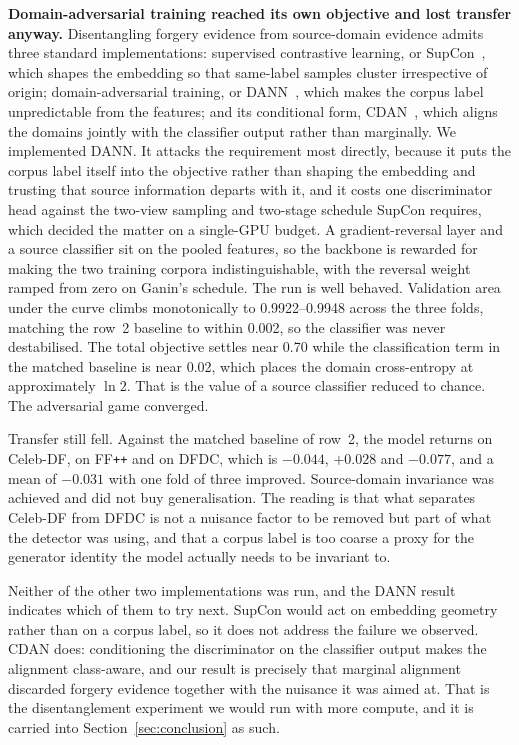 \documentclass[journal,onecolumn]{IEEEtran}
\newcommand{\celebdf}{Celeb-DF}
\newcommand{\ffpp}{FF\texttt{++}}
\newcommand{\dfdc}{DFDC}
\begin{document}
\textbf{Domain-adversarial training reached its own objective and lost
transfer anyway.} Disentangling forgery evidence from source-domain evidence
admits three standard implementations: supervised contrastive learning, or
SupCon~\cite{khosla2020supcon}, which shapes the embedding so that same-label
samples cluster irrespective of origin; domain-adversarial training, or
DANN~\cite{ganin2016dann}, which makes the corpus label unpredictable from the
features; and its conditional form, CDAN~\cite{long2018cdan}, which aligns the
domains jointly with the classifier output rather than marginally. We
implemented DANN. It attacks the requirement most directly, because it puts the
corpus label itself into the objective rather than shaping the embedding and
trusting that source information departs with it, and it costs one discriminator
head against the two-view sampling and two-stage schedule SupCon requires, which
decided the matter on a single-GPU budget. A gradient-reversal layer and a
source classifier sit on the pooled features, so the backbone is rewarded for
making the two training corpora indistinguishable, with the reversal weight
ramped from zero on Ganin's schedule. The run is well behaved. Validation area under the curve climbs
monotonically to 0.9922--0.9948 across the three folds, matching the row~2
baseline to within 0.002, so the classifier was never destabilised. The total
objective settles near 0.70 while the classification term in the matched
baseline is near 0.02, which places the domain cross-entropy at approximately
$\ln 2$. That is the value of a source classifier reduced to chance. The
adversarial game converged.

Transfer still fell. Against the matched baseline of row~2, the model returns
\daCeleb{} on \celebdf{}, \daFF{} on \ffpp{} and \daDFDC{} on \dfdc{},
which is $-0.044$, $+0.028$ and $-0.077$, and a mean of $-0.031$ with one fold
of three improved. Source-domain invariance was achieved and did not buy
generalisation. The reading is that what separates \celebdf{} from \dfdc{} is
not a nuisance factor to be removed but part of what the detector was using,
and that a corpus label is too coarse a proxy for the generator identity the
model actually needs to be invariant to.

Neither of the other two implementations was run, and the DANN result indicates
which of them to try next. SupCon would act on embedding geometry rather than on
a corpus label, so it does not address the failure we observed. CDAN does:
conditioning the discriminator on the classifier output makes the alignment
class-aware, and our result is precisely that marginal alignment discarded
forgery evidence together with the nuisance it was aimed at. That is the
disentanglement experiment we would run with more compute, and it is carried
into Section~\ref{sec:conclusion} as such.
\end{document}
